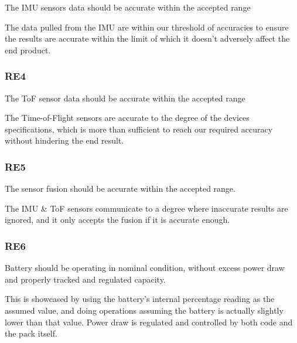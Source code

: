 \documentclass[11pt]{article}
\begin{document}
    \begin{exampleblock}
        The IMU sensors data should be accurate within the accepted range
    \end{exampleblock}

    The data pulled from the IMU are within our threshold of accuracies to ensure the results are accurate within the limit of which it doesn't adversely affect the end product.
    
    \subsubsection{RE4}

    \begin{exampleblock}
        The ToF sensor data should be accurate within the accepted range
    \end{exampleblock}

    The Time-of-Flight sensors are accurate to the degree of the devices specifications, which is more than sufficient to reach our required accuracy without hindering the end result.
    
    \subsubsection{RE5}

    \begin{exampleblock}
        The sensor fusion should be accurate within the accepted range.
    \end{exampleblock}

    The IMU \& ToF sensors communicate to a degree where inaccurate results are ignored, and it only accepts the fusion if it is accurate enough.
    
    \subsubsection{RE6}

    \begin{exampleblock}
        Battery should be operating in nominal condition, without excess power draw and properly tracked and regulated capacity.
    \end{exampleblock}

    This is showcased by using the battery's internal percentage reading as the assumed value, and doing operations assuming the battery is actually slightly lower than that value. Power draw is regulated and controlled by both code and the pack itself.
    
\end{document}
